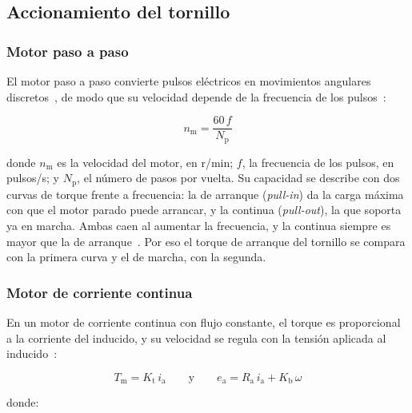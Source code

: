 \subsection{Accionamiento del tornillo}
\label{subsec:fund_accionamiento}

\subsubsection{Motor paso a paso}
\label{subsubsec:fund_paso_a_paso}

El motor paso a paso convierte pulsos eléctricos en movimientos angulares
discretos~\parencite{orozco2024dosificadora}, de modo que su velocidad depende de
la frecuencia de los pulsos~\parencite{nidec2026stepping}:

\begin{equation}
    n_{\mathrm{m}} = \frac{60\, f}{N_{\mathrm{p}}}
    \label{eq:velocidad_paso}
\end{equation}

\noindent donde $n_{\mathrm{m}}$ es la velocidad del motor, en r/min; $f$, la
frecuencia de los pulsos, en pulsos/s; y $N_{\mathrm{p}}$, el número de pasos por
vuelta. Su capacidad se describe con dos curvas de torque frente a frecuencia: la
de arranque (\textit{pull-in}) da la carga máxima con que el motor parado puede
arrancar, y la continua (\textit{pull-out}), la que soporta ya en marcha. Ambas
caen al aumentar la frecuencia, y la continua siempre es mayor que la de
arranque~\parencite{nidec2026stepping}. Por eso el torque de arranque del tornillo
se compara con la primera curva y el de marcha, con la segunda.

\subsubsection{Motor de corriente continua}
\label{subsubsec:fund_motor_cc}

En un motor de corriente continua con flujo constante, el torque es proporcional a
la corriente del inducido, y su velocidad se regula con la tensión aplicada al
inducido~\parencite{ogata2010control}:

\begin{equation}
    T_{\mathrm{m}} = K_{\mathrm{t}}\, i_{\mathrm{a}}
    \qquad \text{y} \qquad
    e_{\mathrm{a}} = R_{\mathrm{a}}\, i_{\mathrm{a}} + K_{\mathrm{b}}\, \omega
    \label{eq:motor_cc}
\end{equation}

\noindent donde:

